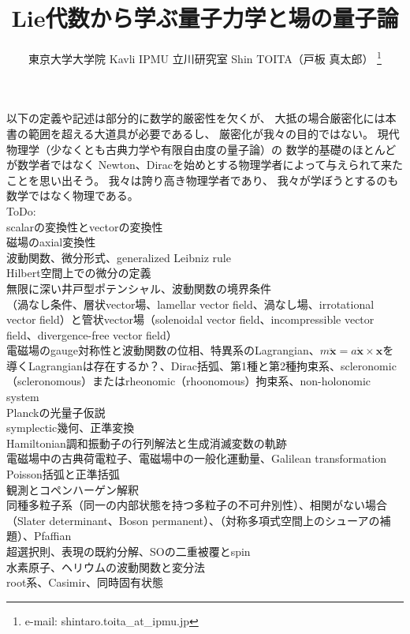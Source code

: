 \documentclass[dvipdfmx, uplatex]{jsarticle}
\title{Lie代数から学ぶ量子力学と場の量子論}
\author{東京大学大学院 Kavli IPMU 立川研究室 \hspace{15pt}Shin TOITA（戸板 真太郎）
\thanks{e-mail: shintaro.toita\_at\_ipmu.jp}}
\begin{document}
\maketitle
\vspace{-4zh}

\tableofcontents
\newpage

以下の定義や記述は部分的に数学的厳密性を欠くが、
大抵の場合厳密化には本書の範囲を超える大道具が必要であるし、
厳密化が我々の目的ではない。
現代物理学（少なくとも古典力学や有限自由度の量子論）の
数学的基礎のほとんどが数学者ではなく
Newton、Diracを始めとする物理学者によって与えられて来たことを思い出そう。
我々は誇り高き物理学者であり、
我々が学ぼうとするのも数学ではなく物理である。
\\

ToDo:
\\scalarの変換性とvectorの変換性
\\磁場のaxial変換性
\\波動関数、微分形式、generalized Leibniz rule
\\Hilbert空間上での微分の定義
\\無限に深い井戸型ポテンシャル、波動関数の境界条件
\\（渦なし条件、層状vector場、lamellar vector field、渦なし場、irrotational vector field）と管状vector場（solenoidal vector field、incompressible vector field、divergence-free vector field）
\\電磁場のgauge対称性と波動関数の位相、特異系のLagrangian、$m\ddot{\bm{x}} = a\dot{\bm{x}}\times\bm{x}$を導くLagrangianは存在するか？、Dirac括弧、第1種と第2種拘束系、scleronomic（scleronomous）またはrheonomic（rhoonomous）拘束系、non-holonomic system
\\Planckの光量子仮説 
\\symplectic幾何、正準変換
\\Hamiltonian調和振動子の行列解法と生成消滅変数の軌跡
\\電磁場中の古典荷電粒子、電磁場中の一般化運動量、Galilean transformation 
\\Poisson括弧と正準括弧
\\観測とコペンハーゲン解釈
\\同種多粒子系（同一の内部状態を持つ多粒子の不可弁別性）、相関がない場合（Slater determinant、Boson permanent）、（対称多項式空間上のシューアの補題）、Pfaffian
\\超選択則、表現の既約分解、SOの二重被覆とspin
\\水素原子、ヘリウムの波動関数と変分法
\\root系、Casimir、同時固有状態
\end{document}
